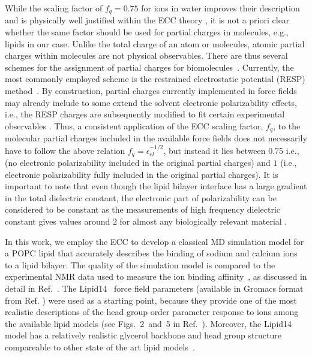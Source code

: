 \documentclass[aip,jcp,twocolumn]{revtex4}
\begin{document}
While the scaling factor of $f_q = 0.75$ for ions in water improves their description and is physically well justified within the ECC theory \cite{Leontyev2011},
it is not a priori  clear whether the same factor should be used for partial charges in molecules,
e.g., lipids in our case. Unlike the total charge of an atom or molecules, atomic partial charges within molecules are not physical observables.
There are thus several schemes for the assignment of partial charges for biomolecules~\cite{Hu2007}.
Currently, the most commonly employed scheme is the restrained electrostatic potential (RESP) method~\cite{RESP_paper,Singh1984}.
By construction, partial charges currently implemented in force fields may already 
include  to some extend the solvent electronic polarizability effects, i.e.,
the RESP charges are subsequently modified to fit certain experimental observables . 
Thus, a consistent application of the ECC scaling factor, $f_q$, to the molecular partial charges
included in the available force fields does not necessarily have to follow the above relation $f_q = \epsilon _{el} ^{-1/2}$, 
but instead it lies between 0.75 i.e., (no electronic polarizability included in the original partial charges)
and $1$ (i.e., electronic polarizability fully included in the original partial charges).
It is important to note that even though the lipid bilayer interface has a large gradient in
the total dielectric constant, the electronic part of polarizability can be considered to be constant
as the measurements of high frequency dielectric constant gives values around 2 
for almost any biologically relevant material \cite{some_original_work, leontyev11}.


In this work, we employ the ECC to develop a classical MD simulation model for
a POPC lipid that accurately describes the binding of sodium and calcium ions to a lipid bilayer.
The quality of the simulation model is compared 
to the experimental NMR data used to measure the ion binding
affinity~\cite{akutsu81,altenbach84,scherer89}, 
as discussed in detail in Ref.~.
The Lipid14~\cite{dickson14} force field parameters (available in Gromacs format from Ref. )
were used as a starting point, because they provide one of the most
realistic descriptions of the head group order parameter response to ions 
among the available lipid models (see Figs.~2~and~5 in Ref.~).
Moreover, the Lipid14 model has a relatively realistic glycerol backbone and
head group structure compareable to other state of the art lipid models~\cite{botan15}.
\end{document}
